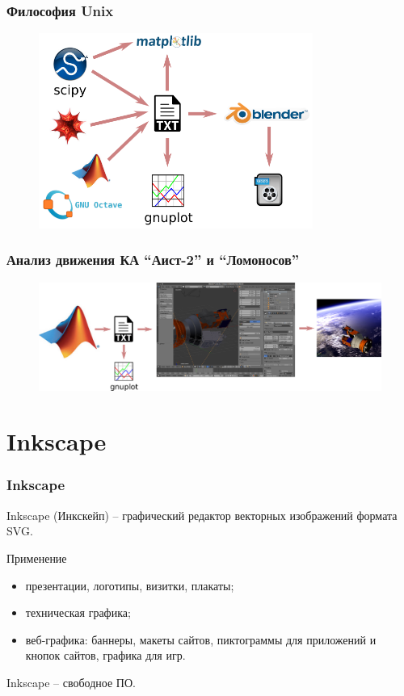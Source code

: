 \documentclass[12pt, compress]{beamer}
\renewcommand{\emph}[1]{\textcolor{dark-blue}{#1}}
\begin{document}
\begin{frame}[t] 
\frametitle{Философия Unix}
\begin{figure}[htbp]  
  \includegraphics[width=0.8\textwidth]{unixway.png}
\end{figure}
\end{frame}

\begin{frame}[c] 
\frametitle{Анализ движения КА ``Аист-2'' и ``Ломоносов''}
\begin{figure}[htbp]  
  \includegraphics[width=1\textwidth]{Aist.png}
\end{figure}
\end{frame}


\section{Inkscape}

\begin{frame}[c]
\frametitle{Inkscape}
\emph{Inkscape} (Инкскейп) -- графический редактор \emph{векторных} изображений формата \emph{SVG}.

\vspace{5pt}

Применение
\begin{itemize}
  \item презентации, логотипы, визитки, плакаты;
  \item техническая графика;
  \item веб-графика: баннеры, макеты сайтов, пиктограммы для приложений и кнопок сайтов, графика для игр.
\end{itemize}
Inkscape -- свободное ПО.
\end{frame}
\end{document}
